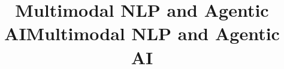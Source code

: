 \documentclass[10pt, aspectratio=149]{beamer}
\title[Multimodal NLP and Agentic AI]{Multimodal NLP and Agentic AI}
\begin{document}
\title[Multimodal NLP and Agentic AI]{Multimodal NLP and Agentic AI}













\end{document}
